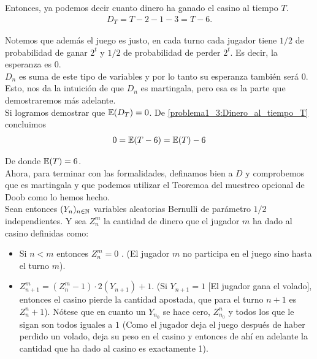 	Entonces, ya podemos decir cuanto dinero ha ganado el casino al tiempo $T$.
	\begin{align}\label{problema1_3:Dinero_al_tiempo_T}
		D_T = T-2 - 1 - 3 = T - 6. 
	\end{align}					   
   
	Notemos que además el juego es justo, en cada turno cada jugador tiene $1/2$ de probabilidad de
	ganar $2^t$ y $1/2$ de probabilidad de perder $2^t$. Es decir, la esperanza es $0$.\\
	
	$D_n$ es suma de este tipo de variables y por lo tanto su esperanza también será $0$.\\
   
	Esto, nos da la intuición de que $D_n$ es martingala, pero esa es la parte que demostraremos más adelante.\\
   
	Si logramos demostrar que $\mathbb{E}(D_T) = 0$. De \eqref{problema1_3:Dinero_al_tiempo_T} concluimos
	\begin{align}
		0 = \mathbb{E}(T - 6) = \mathbb{E}(T) - 6
	\end{align}
	
	De donde $\mathbb{E}(T) = 6$.\\
	
	Ahora, para terminar con las formalidades, definamos bien a $D$ y comprobemos que es martingala y 
	que podemos utilizar el Teoremoa del muestreo opcional de Doob como lo hemos hecho.\\
	
	Sean entonces $(Y_n)_{n \in \mathbb{N}}$ variables aleatorias Bernulli de parámetro $1/2$ independientes.
	Y sea $Z_n^m$ la cantidad de dinero que el jugador $m$ ha dado al casino definidas como:
	
	\begin{itemize}
		\item 
			Si $n < m$ entonces $Z_n^m = 0$ . (El jugador $m$ no participa en el juego sino hasta el turno $m$).
		\item
			$Z_{n+1}^{m} = (Z_n^{m} - 1) \cdot 2(Y_{n+1}) + 1$. (Si $Y_{n + 1} = 1$ [El jugador gana el volado], entonces el casino
			pierde la cantidad apostada, que para el turno $n+1$ es $Z_n^n + 1$). Nótese que en cuanto un $Y_{n_0}$ se hace cero,
			$Z_{n_0}^{n}$ y todos los que le sigan son todos iguales a $1$ (Como el jugador deja el juego después de haber perdido
			un volado, deja su peso en el casino y entonces de ahí en adelante la cantidad que ha dado al casino es exactamente 1).
	\end{itemize}
	
